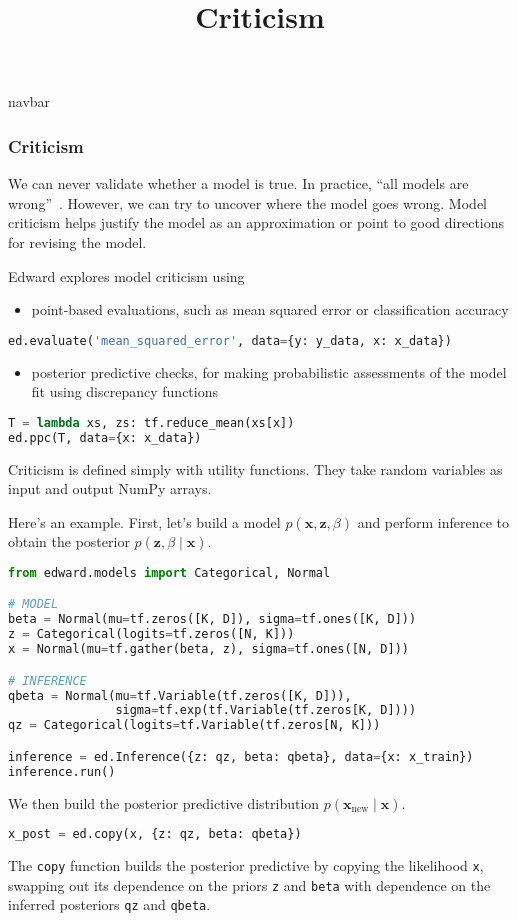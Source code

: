 \title{Criticism}

{{navbar}}

\subsubsection{Criticism}

We can never validate whether a model is true. In practice, ``all
models are wrong''~\citep{box1976science}. However, we can try to
uncover where the model goes wrong. Model criticism helps justify the
model as an approximation or point to good directions for revising the
model.

Edward explores model criticism using
\begin{itemize}
  \item point-based evaluations, such as mean squared error or
  classification accuracy
\end{itemize}
\begin{lstlisting}[language=Python]
ed.evaluate('mean_squared_error', data={y: y_data, x: x_data})
\end{lstlisting}
\begin{itemize}
  \item posterior predictive checks, for making probabilistic
  assessments of the model fit using discrepancy functions
\end{itemize}
\begin{lstlisting}[language=Python]
T = lambda xs, zs: tf.reduce_mean(xs[x])
ed.ppc(T, data={x: x_data})
\end{lstlisting}

Criticism is defined simply with utility functions. They take random
variables as input and output NumPy arrays.

Here's an example. First, let's build a model $p(\mathbf{x},
\mathbf{z}, \beta)$ and perform inference to obtain the posterior
$p(\mathbf{z}, \beta\mid\mathbf{x})$.
\begin{lstlisting}[language=Python]
from edward.models import Categorical, Normal

# MODEL
beta = Normal(mu=tf.zeros([K, D]), sigma=tf.ones([K, D]))
z = Categorical(logits=tf.zeros([N, K]))
x = Normal(mu=tf.gather(beta, z), sigma=tf.ones([N, D]))

# INFERENCE
qbeta = Normal(mu=tf.Variable(tf.zeros([K, D])),
               sigma=tf.exp(tf.Variable(tf.zeros[K, D])))
qz = Categorical(logits=tf.Variable(tf.zeros[N, K]))

inference = ed.Inference({z: qz, beta: qbeta}, data={x: x_train})
inference.run()
\end{lstlisting}
We then build the posterior predictive distribution
$p(\mathbf{x}_{\text{new}}\mid \mathbf{x})$.
\begin{lstlisting}[language=Python]
x_post = ed.copy(x, {z: qz, beta: qbeta})
\end{lstlisting}
The \texttt{copy} function builds the posterior predictive by copying
the likelihood \texttt{x}, swapping out its dependence on the priors
\texttt{z} and \texttt{beta} with dependence on the inferred
posteriors \texttt{qz} and \texttt{qbeta}.

